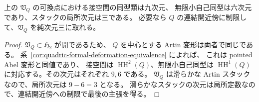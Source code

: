 \begin{corollary}[可換点の局所次元]
\label{cor:quadric-open-stack-dimension}
上の $\mathfrak V_Q$ の可換点における接空間の同型類は九次元、
無限小自己同型は六次元であり、スタックの局所次元は三である。
必要なら $Q$ の連結開近傍に制限して、$\mathfrak V_Q$ を純次元三に取れる。
\end{corollary}
\begin{proof}
$\mathfrak V_Q\subset\mathfrak H_2$ が開であるため、
$Q$ を中心とする Artin 変形は両者で同じである。
系~\ref{cor:quadric-formal-deformation-equivalence} によれば、
これは pointed Abel 変形と同値であり、
接空間は $\operatorname{HH}^2(Q)$、無限小自己同型は
$\operatorname{HH}^1(Q)$ に対応する。その次元はそれぞれ $9,6$ である。
$\mathfrak V_Q$ は滑らかな Artin スタックなので、局所次元は $9-6=3$ となる。
滑らかなスタックの次元は局所定数なので、連結開近傍への制限で最後の主張を得る。
\end{proof}
